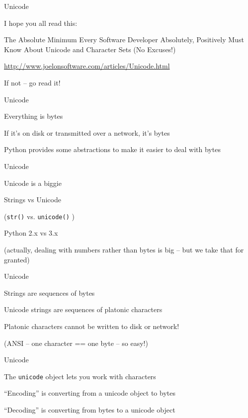 \documentclass{beamer}
\begin{document}
\begin{frame}[fragile]{Unicode}

{\Large I hope you all read this:}

\vfill
{\Large
\centering
The Absolute Minimum Every Software Developer Absolutely,
Positively Must Know About Unicode and Character Sets (No Excuses!)

}

\vfill
\url{http://www.joelonsoftware.com/articles/Unicode.html}

\vfill
{\Large If not -- go read it!}

\end{frame}

\begin{frame}[fragile]{Unicode}

{\Large
\vfill

Everything is bytes

\vfill
If it's on disk or transmitted over a network, it's bytes

\vfill
Python provides some abstractions to make it easier to deal with bytes

\vfill
}

\end{frame}

\begin{frame}[fragile]{Unicode}

{\Large
\vfill

Unicode is a biggie

\vfill
Strings vs Unicode 
}

{\large (\verb|str()| vs. \verb|unicode()| ) }

\vfill
{\Large Python 2.x vs 3.x}


\vfill
(actually, dealing with numbers rather than bytes is big -- but we take that for granted)

\end{frame}

\begin{frame}[fragile]{Unicode}

{\Large
\vfill
Strings are sequences of bytes

\vfill
Unicode strings are sequences of platonic characters

\vfill
Platonic characters cannot be written to disk or network!
}
\vfill
(ANSI -- one character == one byte -- so easy!)
\end{frame}

\begin{frame}[fragile]{Unicode}

{\Large
\vfill
The \verb|unicode| object lets you work with characters

\vfill
``Encoding'' is converting from a unicode object to bytes

\vfill
``Decoding'' is converting from bytes to a unicode object
}

\vfill
\end{frame}
\end{document}
